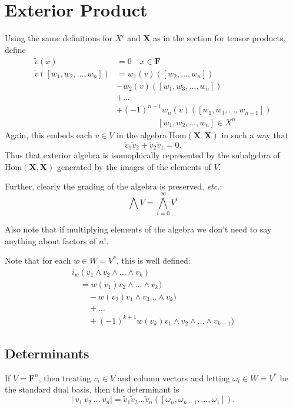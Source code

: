 \documentclass{article}
\begin{document}
\section{Exterior Product}
Using the same definitions for $X^i$ and $\mathbf{X}$ as in the section for tensor products,
define
\begin{align}
  \tilde{v}(x) & = 0 \quad x \in \mathbf{F} \\
  \tilde{v}\left(\left[ w_1, w_2, \ldots, w_n\right]\right) 
      &= w_1(v) \left(\left[ w_2, \ldots, w_n\right]\right)    \nonumber \\
      &- w_2(v) \left(\left[ w_1, w_3, \ldots, w_n\right]\right)   \nonumber \\
      &+ \ldots  \nonumber \\
      &+ (-1)^{n+1} w_n(v) \left(\left[ w_1, w_3, \ldots, w_{n-1}\right]\right)   \nonumber \\
      & \quad \quad \quad \quad \quad     \left[ w_1, w_2, \ldots, w_n\right] \in X^n
\end{align}
Again, this embeds each $v\in V$ in the algebra $\text{Hom}(\mathbf{X}, \mathbf{X})$
in such a way that
\[
    \tilde{v}_1 \tilde{v}_2 + \tilde{v}_2 \tilde{v}_1 = 0.
\]
Thus that exterior algebra is isomophically represented by the subalgebra of 
$\text{Hom}(\mathbf{X}, \mathbf{X})$ generated by the images of the elements of $V$. 

Further, clearly the grading of the algebra is preserved, \emph{etc.}:
\[
  \bigwedge V = \bigwedge_{i=0}^{\infty} V^i
\]


Also note that if multiplying elements of the algebra we don't need to say anything about
factors of $n!$.


Note that for each $w\in W=V^*$, this is well defined:
\begin{align}
  i_w (v_1 \wedge v_2 \wedge \ldots \wedge v_k) \nonumber \\
  \quad = w(v_1) v_2 \wedge \ldots \wedge v_k) \nonumber \\
  \quad \quad - w(v_2) v_1 \wedge v_3 \ldots \wedge v_k) \nonumber \\
  \quad \quad + \ldots  \nonumber \\
  \quad \quad + (-1)^{k+1} w(v_k) v_1 \wedge v_2  \wedge \ldots \wedge v_{k-1}) 
\end{align}


\subsection{Determinants}
If $V=\mathbf{F}^n$, then treating $v_i\in V$ and column vectors and letting 
$\omega_i \in W=V^*$ be the standard dual basis, then the determinant is
\[
\left| \: v_1 \: v_2 \: \ldots \: v_n \right| 
 = \tilde{v}_1 \tilde{v}_2 \ldots \tilde{v}_n \left( \left[ \omega_n, \omega_{n-1}, \ldots,
                                                      \omega_1 \right] \right).
\]
\end{document}
